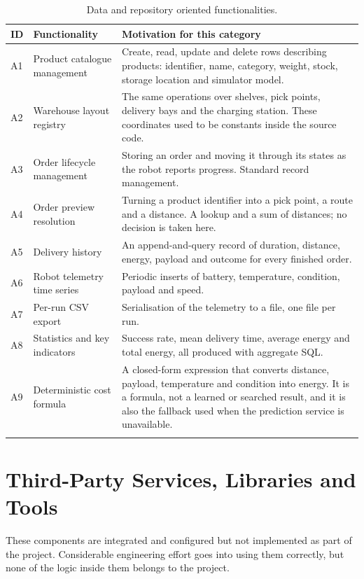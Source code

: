 \documentclass[12pt,a4paper]{report}
\begin{document}
\begin{longtable}{@{}p{}p{}p{}@{}}
\toprule
\textbf{ID} & \textbf{Functionality} & \textbf{Motivation for this category} \\
\midrule
\endhead
A1 & Product catalogue management & Create, read, update and delete rows describing products:
identifier, name, category, weight, stock, storage location and simulator model. \\
A2 & Warehouse layout registry & The same operations over shelves, pick points, delivery bays and
the charging station. These coordinates used to be constants inside the source code. \\
A3 & Order lifecycle management & Storing an order and moving it through its states as the robot
reports progress. Standard record management. \\
A4 & Order preview resolution & Turning a product identifier into a pick point, a route and a
distance. A lookup and a sum of distances; no decision is taken here. \\
A5 & Delivery history & An append-and-query record of duration, distance, energy, payload and
outcome for every finished order. \\
A6 & Robot telemetry time series & Periodic inserts of battery, temperature, condition, payload and
speed. \\
A7 & Per-run CSV export & Serialisation of the telemetry to a file, one file per run. \\
A8 & Statistics and key indicators & Success rate, mean delivery time, average energy and total
energy, all produced with aggregate SQL. \\
A9 & Deterministic cost formula & A closed-form expression that converts distance, payload,
temperature and condition into energy. It is a formula, not a learned or searched result, and it is
also the fallback used when the prediction service is unavailable. \\
\bottomrule
\caption{Data and repository oriented functionalities.}
\label{tab:cat-a}
\end{longtable}

\section{Third-Party Services, Libraries and Tools}
These components are integrated and configured but not implemented as part of the project.
Considerable engineering effort goes into using them correctly, but none of the logic inside them
belongs to the project.
\end{document}
